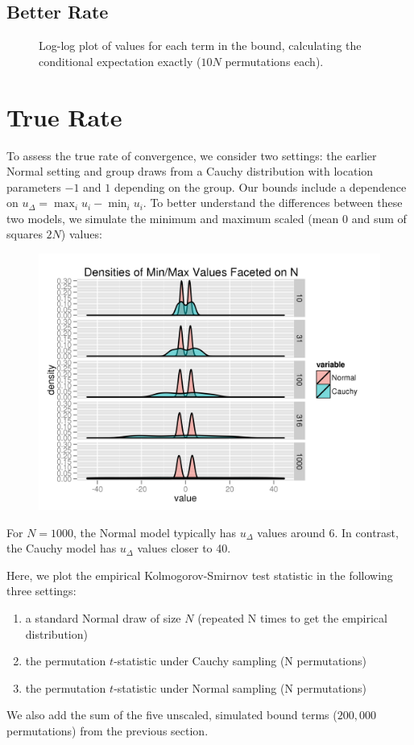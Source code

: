 \subsection{Better Rate}
\begin{figure}[!ht]
  \centering
  
  \caption{Log-log plot of values for each term in the bound, calculating the conditional
    expectation exactly ($10N$ permutations each).}
\end{figure}


\section{True Rate}
To assess the true rate of convergence, we consider two settings: the earlier Normal setting and
group draws from a Cauchy distribution with location parameters $-1$ and $1$ depending on the
group.  Our bounds include a dependence on $u_{\Delta} = \max_i u_{i} - \min_i u_{i}$.  To better
understand the differences between these two models, we simulate the minimum and maximum scaled
(mean $0$ and sum of squares $2N$) values:
\begin{figure}[!ht]
  \centering
  \includegraphics{./simulations/sim5.png}
\end{figure}

For $N=1000$, the Normal model typically has $u_{\Delta}$ values around 6.  In contrast, the Cauchy
model has $u_{\Delta}$ values closer to 40.
\clearpage

Here, we plot the empirical Kolmogorov-Smirnov test statistic in the following three settings:
\begin{enumerate}
\item a standard Normal draw of size $N$ (repeated N times to get the empirical distribution)
\item the permutation $t$-statistic under Cauchy sampling (N permutations)
\item the permutation $t$-statistic under Normal sampling (N permutations)
\end{enumerate}
We also add the sum of the five unscaled, simulated bound terms ($200,000$ permutations) from the
previous section.


